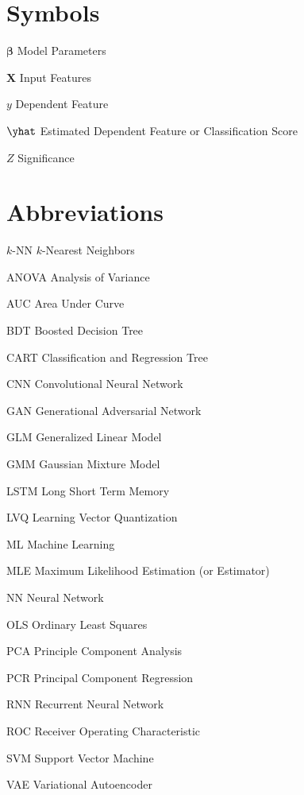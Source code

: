 \abbreviations

\section*{Symbols}

\begin{symbollist}
	\item[$\bm{\beta}$] Model Parameters
	\item[$\mathbf{X}$] Input Features
	\item[$y$] Dependent Feature
	\item[$\yhat$] Estimated Dependent Feature or Classification Score
	\item[$Z$] Significance
\end{symbollist}

\section*{Abbreviations}

\begin{symbollist}
	\item[$k$-NN] $k$-Nearest Neighbors
	\item[ANOVA] Analysis of Variance
	\item[AUC] Area Under Curve
	\item[BDT] Boosted Decision Tree
	\item[CART] Classification and Regression Tree
	\item[CNN] Convolutional Neural Network
	\item[GAN] Generational Adversarial Network
	\item[GLM] Generalized Linear Model
	\item[GMM] Gaussian Mixture Model
	\item[LSTM] Long Short Term Memory
	\item[LVQ] Learning Vector Quantization
	\item[ML] Machine Learning
	\item[MLE] Maximum Likelihood Estimation (or Estimator)
	\item[NN] Neural Network
	\item[OLS] Ordinary Least Squares
	\item[PCA] Principle Component Analysis
	\item[PCR] Principal Component Regression
	\item[RNN] Recurrent Neural Network
	\item[ROC] Receiver Operating Characteristic
	\item[SVM] Support Vector Machine
	\item[VAE] Variational Autoencoder
\end{symbollist}
